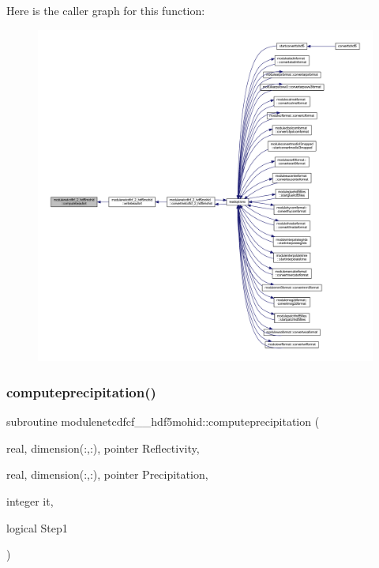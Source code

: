Here is the caller graph for this function\+:\nopagebreak
\begin{figure}[H]
\begin{center}
\leavevmode
\includegraphics[width=350pt]{namespacemodulenetcdfcf__2__hdf5mohid_a342a5907548f35cf4975a0ffd50c9a3c_icgraph}
\end{center}
\end{figure}
\mbox{\label{namespacemodulenetcdfcf__2__hdf5mohid_acd498610133c943ab2fe7e2cfc7c69e1}} 
\subsubsection{\texorpdfstring{computeprecipitation()}{computeprecipitation()}}
{\footnotesize\ttfamily subroutine modulenetcdfcf\+\_\+\_\+hdf5mohid\+::computeprecipitation (\begin{DoxyParamCaption}\item[{real, dimension(\+:,\+:), pointer}]{Reflectivity,  }\item[{real, dimension(\+:,\+:), pointer}]{Precipitation,  }\item[{integer}]{it,  }\item[{logical}]{Step1 }\end{DoxyParamCaption})\hspace{0.3cm}{\ttfamily [private]}}

